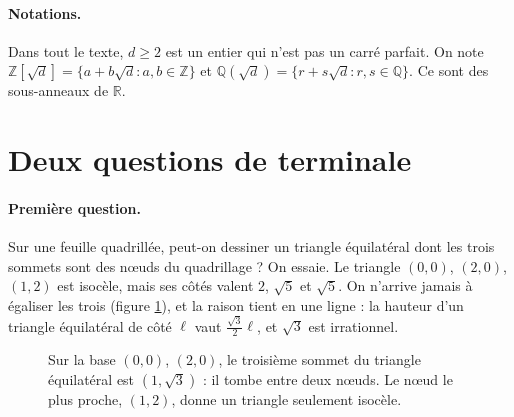 \documentclass[11pt,a4paper]{article}
\theoremstyle{plain}
\theoremstyle{definition}
\theoremstyle{remark}
\newcommand{\Z}{\mathbb{Z}}
\newcommand{\Q}{\mathbb{Q}}
\newcommand{\R}{\mathbb{R}}
\begin{document}
\paragraph{Notations.} Dans tout le texte, $d\geq2$ est un entier qui n'est pas un carré parfait. On note $\Z[\sqrt d]=\{a+b\sqrt d : a,b\in\Z\}$ et $\Q(\sqrt d)=\{r+s\sqrt d : r,s\in\Q\}$. Ce sont des sous-anneaux de $\R$.

\tableofcontents

\section{Deux questions de terminale}

\paragraph{Première question.} Sur une feuille quadrillée, peut-on dessiner un triangle équilatéral dont les trois sommets sont des nœuds du quadrillage ? On essaie. Le triangle $(0,0)$, $(2,0)$, $(1,2)$ est isocèle, mais ses côtés valent $2$, $\sqrt5$ et $\sqrt5$. On n'arrive jamais à égaliser les trois (figure \ref{fig:quadrillage}), et la raison tient en une ligne : la hauteur d'un triangle équilatéral de côté $\ell$ vaut $\frac{\sqrt3}2\ell$, et $\sqrt3$ est irrationnel.

\begin{figure}[h]
\centering
{}
\caption{Sur la base $(0,0)$, $(2,0)$, le troisième sommet du triangle équilatéral est $(1,\sqrt3)$ : il tombe entre deux nœuds. Le nœud le plus proche, $(1,2)$, donne un triangle seulement isocèle.}\label{fig:quadrillage}
\end{figure}
\end{document}
